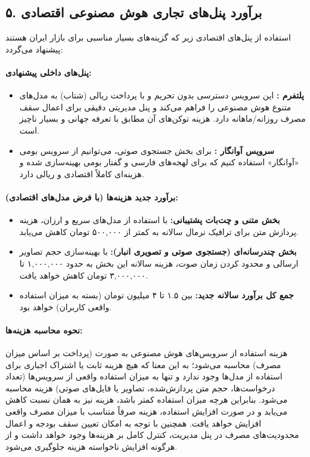 \documentclass[11pt,a4paper]{article}
\begin{document}
\subsection{۵. برآورد پنل‌های تجاری هوش مصنوعی اقتصادی}
استفاده از پنل‌های اقتصادی زیر که گزینه‌های بسیار مناسبی برای بازار ایران هستند پیشنهاد می‌گردد:

\paragraph{پنل‌های داخلی پیشنهادی:}
\begin{itemize}
    \item \textbf{پلتفرم  :} این سرویس دسترسی بدون تحریم و با پرداخت ریالی (شتاب) به مدل‌های متنوع هوش مصنوعی را فراهم می‌کند و پنل مدیریتی دقیقی برای اعمال سقف مصرف روزانه/ماهانه دارد. هزینه توکن‌های آن مطابق با تعرفه جهانی و بسیار ناچیز است.
    \item \textbf{سرویس آوانگار :} برای بخش جستجوی صوتی، می‌توانیم از سرویس بومی «آوانگار» استفاده کنیم که برای لهجه‌های فارسی و گفتار بومی بهینه‌سازی شده و هزینه‌ای کاملاً اقتصادی و ریالی دارد.
\end{itemize}

\paragraph{برآورد جدید هزینه‌ها (با فرض مدل‌های اقتصادی):}
\begin{itemize}
    \item \textbf{بخش متنی و چت‌بات پشتیبانی:} با استفاده از مدل‌های سریع و ارزان، هزینه پردازش متن برای ترافیک نرمال سالانه به کمتر از ۵۰۰,۰۰۰ تومان کاهش می‌یابد.
    \item \textbf{بخش چندرسانه‌ای (جستجوی صوتی و تصویری انبار):} با بهینه‌سازی حجم تصاویر ارسالی و محدود کردن زمان صوت، هزینه سالانه این بخش به حدود ۱,۰۰۰,۰۰۰ تا ۳,۰۰۰,۰۰۰ تومان کاهش خواهد یافت.
    \item \textbf{جمع کل برآورد سالانه جدید:} بین ۱.۵ تا ۴ میلیون تومان (بسته به میزان استفاده واقعی کاربران) خواهد بود.
\end{itemize}

\paragraph{نحوه محاسبه هزینه‌ها:}
هزینه استفاده از سرویس‌های هوش مصنوعی به صورت  (پرداخت بر اساس میزان مصرف) محاسبه می‌شود؛ به این معنا که هیچ هزینه ثابت یا اشتراک اجباری برای استفاده از مدل‌ها وجود ندارد و تنها به میزان استفاده واقعی از سرویس‌ها (تعداد درخواست‌ها، حجم متن پردازش‌شده، تصاویر یا فایل‌های صوتی) هزینه محاسبه می‌شود. بنابراین هرچه میزان استفاده کمتر باشد، هزینه نیز به همان نسبت کاهش می‌یابد و در صورت افزایش استفاده، هزینه صرفاً متناسب با میزان مصرف واقعی افزایش خواهد یافت. همچنین با توجه به امکان تعیین سقف بودجه و اعمال محدودیت‌های مصرف در پنل مدیریت، کنترل کامل بر هزینه‌ها وجود خواهد داشت و از هرگونه افزایش ناخواسته هزینه جلوگیری می‌شود.
\end{document}
